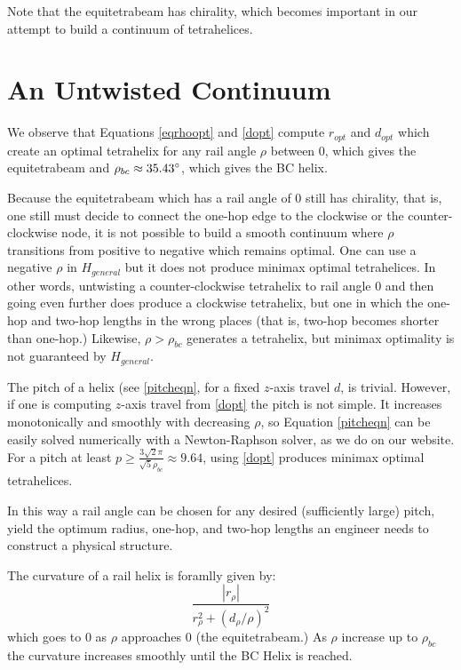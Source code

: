 \documentclass[review]{siamonline1116}
\begin{document}
Note that the equitetrabeam has chirality, which becomes important in our attempt to build a
continuum of tetrahelices.

\section{An Untwisted Continuum}
\label{sec:continuum}


We observe that Equations \eqref{eqrhoopt} and \eqref{dopt} compute $r_{opt}$ and $d_{opt}$ which
create an optimal tetrahelix for any rail angle $\rho$ between $0$, which
gives the equitetrabeam and
$\rho_{bc} \approx 35.43 \degree$, which gives the BC helix.

 Because the equitetrabeam which has a rail angle of $0$ still has
 chirality, that is, one still must decide to connect the one-hop edge to
 the clockwise or the counter-clockwise node, it is not possible to build
 a smooth continuum where $\rho$ transitions from positive to negative
 which remains optimal. One can use a negative $\rho$ in $H_{general}$
 but it does not produce minimax optimal tetrahelices. In other words,
 untwisting a counter-clockwise tetrahelix to rail angle $0$ and then going
even further does produce a clockwise tetrahelix, but one in which the
 one-hop and two-hop lengths in the wrong places (that is, two-hop
 becomes shorter than one-hop.) Likewise, $\rho > \rho_{bc}$ generates
 a tetrahelix, but minimax optimality is not guaranteed by $H_{general}$.
 
 The pitch of a helix (see \cref{pitcheqn}, for a fixed $z$-axis travel $d$,
 is trivial.
However, if one is computing 
$z$-axis travel from \eqref{dopt} the pitch is not simple.
It increases monotonically and smoothly with decreasing $\rho$, so
Equation \eqref{pitcheqn} can be easily solved numerically with a Newton-Raphson
solver, as we do on our website.
For a pitch at least $ p \geq \frac{3  \sqrt{2}  \pi}{\sqrt{5}\rho_{bc}} \approx 9.64 $,
using \eqref{dopt} produces minimax optimal tetrahelices.

In this way a rail angle can be chosen for any desired (sufficiently large) pitch, yield
the optimum radius, one-hop, and two-hop lengths an engineer needs to
construct a physical structure.

The curvature of a rail helix is foramlly given by:
\begin{equation}
  \frac{|r_{\rho}|}{r_{\rho}^2 + (d_{\rho}/\rho)^2}
\end{equation}
which goes to $0$ as $\rho$ approaches $0$ (the equitetrabeam.)
As $\rho$ increase up to $\rho_{bc}$ the curvature increases smoothly until the BC Helix is reached.
\end{document}
